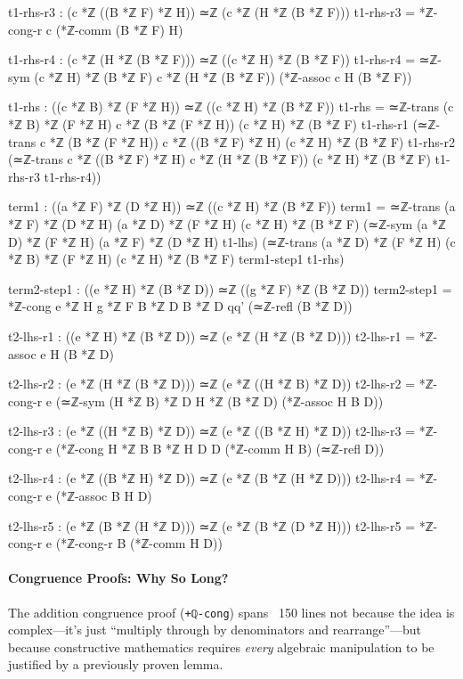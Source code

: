 \documentclass[11pt,a4paper]{book}
\begin{document}
\begin{code}
    t1-rhs-r3 : (c *ℤ ((B *ℤ F) *ℤ H)) ≃ℤ (c *ℤ (H *ℤ (B *ℤ F)))
    t1-rhs-r3 = *ℤ-cong-r c (*ℤ-comm (B *ℤ F) H)
    
    t1-rhs-r4 : (c *ℤ (H *ℤ (B *ℤ F))) ≃ℤ ((c *ℤ H) *ℤ (B *ℤ F))
    t1-rhs-r4 = ≃ℤ-sym {(c *ℤ H) *ℤ (B *ℤ F)} {c *ℤ (H *ℤ (B *ℤ F))} (*ℤ-assoc c H (B *ℤ F))
    
    t1-rhs : ((c *ℤ B) *ℤ (F *ℤ H)) ≃ℤ ((c *ℤ H) *ℤ (B *ℤ F))
    t1-rhs = ≃ℤ-trans {(c *ℤ B) *ℤ (F *ℤ H)} {c *ℤ (B *ℤ (F *ℤ H))} {(c *ℤ H) *ℤ (B *ℤ F)} t1-rhs-r1
             (≃ℤ-trans {c *ℤ (B *ℤ (F *ℤ H))} {c *ℤ ((B *ℤ F) *ℤ H)} {(c *ℤ H) *ℤ (B *ℤ F)} t1-rhs-r2
             (≃ℤ-trans {c *ℤ ((B *ℤ F) *ℤ H)} {c *ℤ (H *ℤ (B *ℤ F))} {(c *ℤ H) *ℤ (B *ℤ F)} t1-rhs-r3 t1-rhs-r4))

    term1 : ((a *ℤ F) *ℤ (D *ℤ H)) ≃ℤ ((c *ℤ H) *ℤ (B *ℤ F))
    term1 = ≃ℤ-trans {(a *ℤ F) *ℤ (D *ℤ H)} {(a *ℤ D) *ℤ (F *ℤ H)} {(c *ℤ H) *ℤ (B *ℤ F)}
              (≃ℤ-sym {(a *ℤ D) *ℤ (F *ℤ H)} {(a *ℤ F) *ℤ (D *ℤ H)} t1-lhs)
              (≃ℤ-trans {(a *ℤ D) *ℤ (F *ℤ H)} {(c *ℤ B) *ℤ (F *ℤ H)} {(c *ℤ H) *ℤ (B *ℤ F)} term1-step1 t1-rhs)

    term2-step1 : ((e *ℤ H) *ℤ (B *ℤ D)) ≃ℤ ((g *ℤ F) *ℤ (B *ℤ D))
    term2-step1 = *ℤ-cong {e *ℤ H} {g *ℤ F} {B *ℤ D} {B *ℤ D} qq' (≃ℤ-refl (B *ℤ D))
    
    t2-lhs-r1 : ((e *ℤ H) *ℤ (B *ℤ D)) ≃ℤ (e *ℤ (H *ℤ (B *ℤ D)))
    t2-lhs-r1 = *ℤ-assoc e H (B *ℤ D)
    
    t2-lhs-r2 : (e *ℤ (H *ℤ (B *ℤ D))) ≃ℤ (e *ℤ ((H *ℤ B) *ℤ D))
    t2-lhs-r2 = *ℤ-cong-r e (≃ℤ-sym {(H *ℤ B) *ℤ D} {H *ℤ (B *ℤ D)} (*ℤ-assoc H B D))
    
    t2-lhs-r3 : (e *ℤ ((H *ℤ B) *ℤ D)) ≃ℤ (e *ℤ ((B *ℤ H) *ℤ D))
    t2-lhs-r3 = *ℤ-cong-r e (*ℤ-cong {H *ℤ B} {B *ℤ H} {D} {D} (*ℤ-comm H B) (≃ℤ-refl D))
    
    t2-lhs-r4 : (e *ℤ ((B *ℤ H) *ℤ D)) ≃ℤ (e *ℤ (B *ℤ (H *ℤ D)))
    t2-lhs-r4 = *ℤ-cong-r e (*ℤ-assoc B H D)
    
    t2-lhs-r5 : (e *ℤ (B *ℤ (H *ℤ D))) ≃ℤ (e *ℤ (B *ℤ (D *ℤ H)))
    t2-lhs-r5 = *ℤ-cong-r e (*ℤ-cong-r B (*ℤ-comm H D))
\end{code}

\paragraph{Congruence Proofs: Why So Long?}
The addition congruence proof (\texttt{+ℚ-cong}) spans ~150 lines not because the idea 
is complex—it's just ``multiply through by denominators and rearrange''—but because 
constructive mathematics requires \emph{every} algebraic manipulation to be justified 
by a previously proven lemma.
\end{document}
